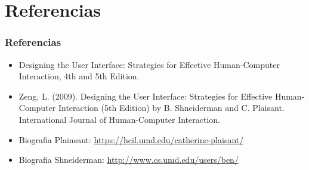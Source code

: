 \documentclass[11pt]{beamer}
\begin{document}
\section{Referencias}
\begin{frame}
\frametitle{Referencias}
\begin{itemize}
\item Designing the User Interface: Strategies for Effective Human-Computer Interaction, 4th and 5th Edition.
\item Zeng, L. (2009). Designing the User Interface: Strategies for Effective Human-Computer Interaction (5th Edition) by B. Shneiderman and C. Plaisant. International Journal of Human-Computer Interaction.
\item Biografia Plainsant: \url{https://hcil.umd.edu/catherine-plaisant/}
\item Biografia Shneiderman: \url{http://www.cs.umd.edu/users/ben/}
\end{itemize}
\end{frame}
\end{document}
